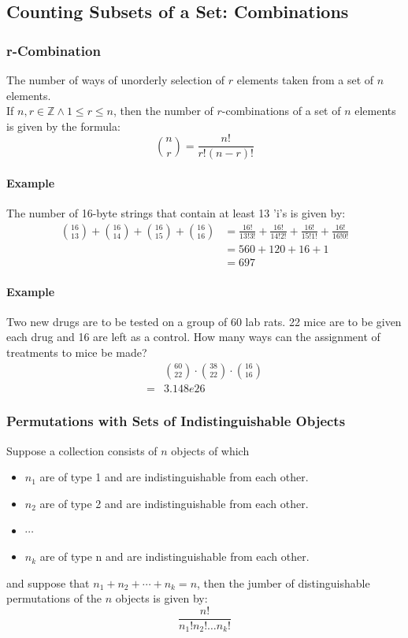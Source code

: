 \subsection{Counting Subsets of a Set: Combinations}
\hrulefill
\subsubsection*{r-Combination}
The number of ways of unorderly selection of $r$ elements taken from a set of  $n$ elements.\\
If $n, r \in \mathbb{Z} \land 1 \leq r \leq n$, then the number of $r$-combinations of a set of $n$ elements is
given by the formula:
\begin{equation*}
    \binom{n}{r} = \frac{n!}{r!(n - r)!}
\end{equation*}

\paragraph*{Example}
The number of 16-byte strings that contain at least 13 'i's is given by:
\begin{align*}
    \binom{16}{13} + \binom{16}{14} + \binom{16}{15} + \binom{16}{16} &= \frac{16!}{13!3!} + \frac{16!}{14!2!} + \frac{16!}{15!1!} + \frac{16!}{16!0!} \\
    &= 560 + 120 + 16 + 1 \\&= 697
\end{align*}

\paragraph*{Example}
Two new drugs are to be tested on a group of 60 lab rats. 22 mice are to be given each drug and 16 are left as a control.
How many ways can the assignment of treatments to mice be made?
\begin{align*}
    &\binom{60}{22} \cdot \binom{38}{22} \cdot \binom{16}{16}\\
    =& 3.148e26
\end{align*}

\pagebreak

\subsubsection*{Permutations with Sets of Indistinguishable Objects}
Suppose a collection consists of $n$ objects of which
\begin{itemize}
    \item $n_1$ are of type 1 and are indistinguishable from each other.
    \item $n_2$ are of type 2 and are indistinguishable from each other.
    \item $\cdots$
    \item $n_k$ are of type n and are indistinguishable from each other.
\end{itemize}
and suppose that $n_1 + n_2 + \cdots + n_k = n$, then the jumber of distinguishable permutations of the
$n$ objects is given by:
\begin{equation*}
    \frac{n!}{n_1!n_2! \dots n_k!}
\end{equation*} 





